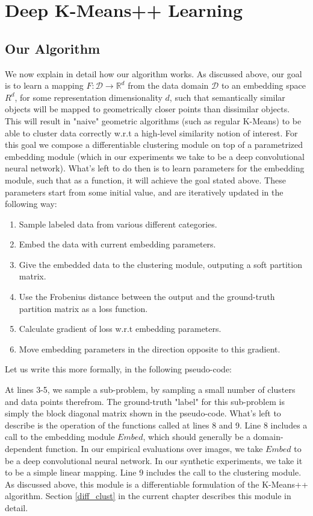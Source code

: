 \chapter{Deep K-Means++ Learning}
\section{Our Algorithm}
We now explain in detail  how our algorithm works. As discussed above, our goal is to learn a mapping $F:\mathcal{D}\rightarrow\mathbb{R}^d$ from the data domain $\mathcal{D}$ to an embedding space $R^d$, for some representation dimensionality $d$, such that semantically similar objects will be mapped to geometrically closer points than dissimilar objects. This will result in "naive" geometric algorithms (such as regular K-Means) to be able to cluster data correctly w.r.t a high-level similarity notion of interest. For this goal we compose a differentiable clustering module on top of a parametrized embedding module (which in our experiments we take to be a deep convolutional neural network). What's left to do then is to learn parameters for the embedding module, such that as a function, it will achieve the goal stated above.
These parameters start from some initial value, and are iteratively updated in the following way:
\begin{enumerate}
\item Sample labeled data from various different categories.
\item Embed the data with current embedding parameters.
\item Give the embedded data to the clustering module, outputing a soft partition matrix.
\item Use the Frobenius distance between the output and the ground-truth partition matrix as a loss function.
\item Calculate gradient of loss w.r.t embedding parameters.
\item Move embedding parameters in the direction opposite to this gradient.
\end{enumerate}
Let us write this more formally, in the following pseudo-code:

At lines 3-5, we sample a sub-problem, by sampling a small number of clusters and data points therefrom. The ground-truth "label" for this sub-problem is simply the block diagonal matrix shown in the pseudo-code. 
What's left to describe is the operation of the functions called at lines 8 and 9. Line 8 includes a call to the embedding module $Embed$, which should generally be a domain-dependent function. In our empirical evaluations over images, we take $Embed$ to be a deep convolutional neural network. In our synthetic experiments, we take it to be a simple linear mapping.
Line 9 includes the call to the clustering module. As discussed above, this module is a differentiable formulation of the K-Means++ algorithm. Section \ref{diff_clust} in the current chapter describes this module in detail.
